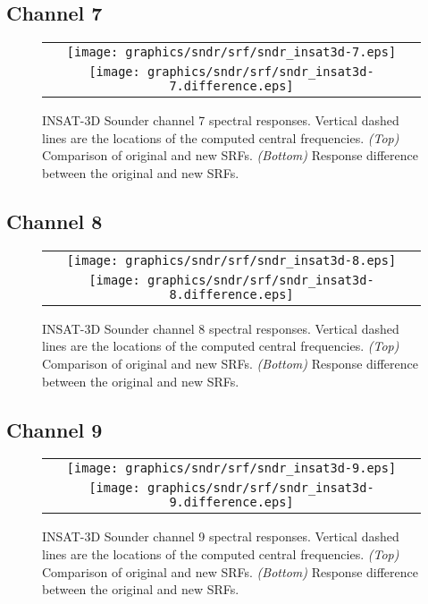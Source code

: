 \subsection{Channel 7}
\begin{figure}[H]
  \label{fig:sndr_ch7}
  \centering
  \begin{tabular}{c}
    \texttt{[image: graphics/sndr/srf/sndr\_insat3d-7.eps]} \\
    \texttt{[image: graphics/sndr/srf/sndr\_insat3d-7.difference.eps]}
  \end{tabular}
  \caption{INSAT-3D Sounder channel 7 spectral responses. Vertical dashed lines are the locations of the computed central frequencies. \emph{(Top)} Comparison of original and new SRFs. \emph{(Bottom)} Response difference between the original and new SRFs.}
\end{figure}

\subsection{Channel 8}
\begin{figure}[H]
  \label{fig:sndr_ch8}
  \centering
  \begin{tabular}{c}
    \texttt{[image: graphics/sndr/srf/sndr\_insat3d-8.eps]} \\
    \texttt{[image: graphics/sndr/srf/sndr\_insat3d-8.difference.eps]}
  \end{tabular}
  \caption{INSAT-3D Sounder channel 8 spectral responses. Vertical dashed lines are the locations of the computed central frequencies. \emph{(Top)} Comparison of original and new SRFs. \emph{(Bottom)} Response difference between the original and new SRFs.}
\end{figure}

\subsection{Channel 9}
\begin{figure}[H]
  \label{fig:sndr_ch9}
  \centering
  \begin{tabular}{c}
    \texttt{[image: graphics/sndr/srf/sndr\_insat3d-9.eps]} \\
    \texttt{[image: graphics/sndr/srf/sndr\_insat3d-9.difference.eps]}
  \end{tabular}
  \caption{INSAT-3D Sounder channel 9 spectral responses. Vertical dashed lines are the locations of the computed central frequencies. \emph{(Top)} Comparison of original and new SRFs. \emph{(Bottom)} Response difference between the original and new SRFs.}
\end{figure}

